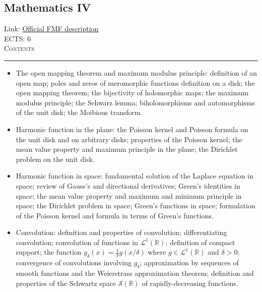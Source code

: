 \documentclass[11pt, a4paper]{article}
\newenvironment{course}[3]{
\subsection{#1}%
Link: \href{#2}{Official FMF description}\\%
ECTS: #3%
\vspace{1ex}
\\
{\large \textsc{Contents}}\\[-0.9ex]%
\rule{\textwidth}{0.5pt}
\vspace{-3ex}
}
{}
\newenvironment{chapter}[1]{
\begin{tcolorbox}[title=#1, breakable]
}
{\end{tcolorbox}}
\begin{document}
\begin{course}{Mathematics IV}{https://www.fmf.uni-lj.si/en/study-physics/programmes/1fiz/2020/7000777/courses/523/}{6}
\begin{chapter}{Complex analysis}
\begin{itemize}
            \item The open mapping theorem and maximum modulus principle: definition of an open map; poles and zeros of meromorphic functions definition on a disk; the open mapping theorem; the bijectivity of holomorphic maps; the maximum modulus principle; the Schwarz lemma; biholomorphisms and automorphisms of the unit disk; the Moibious transform.
        
        \end{itemize}
    \end{chapter}

    \begin{chapter}{Harmonic functions}
        \begin{itemize}
        
            \item Harmonic function in the plane: the Poisson kernel and Poisson formula on the unit disk and on arbitrary disks; properties of the Poisson kernel; the mean value property and maximum principle in the plane; the Dirichlet problem on the unit disk.

            \item Harmonic function in space: fundamental solution of the Laplace equation in space; review of Gauss's and directional derivatives; Green's identities in space; the mean value property and maximum and minimum principle in space; the Dirichlet problem in space; Green's functions in space; formulation of the Poisson kernel and formula in terms of Green's functions.
        
        \end{itemize}
    \end{chapter}

    \begin{chapter}{Fourier analysis}
        \begin{itemize}
        
            \item Convolution: definition and properties of convolution; differentiating convolution;
            convolution of functions in $ \mathcal{L}^{1}(\mathbb{R}) $; definition of compact support; the function $ g_{\delta}(x) = \frac{1}{\delta} g(x/\delta) $ where $ g \in \mathcal{L}^{1}(\mathbb{R}) $ and $ \delta > 0 $; convergence of convolutions involving $ g_{\delta} $;
            approximation by sequences of smooth functions and the Weierstrass approximation theorem; definition and properties of the Schwartz space $ \mathcal{S}(\mathbb{R}) $ of rapidly-decreasing functions.


\end{itemize}
\end{chapter}
\end{course}
\end{document}
